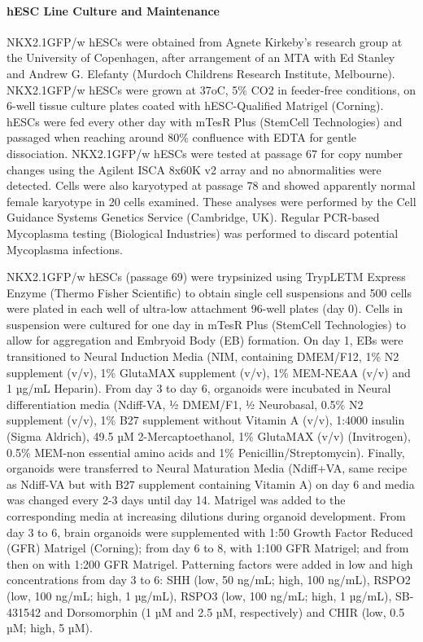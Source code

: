 \paragraph{hESC Line Culture and Maintenance}
NKX2.1GFP/w hESCs were obtained from Agnete Kirkeby’s research group at the University of Copenhagen, after arrangement of an MTA with Ed Stanley and Andrew G. Elefanty (Murdoch Childrens Research Institute, Melbourne). NKX2.1GFP/w hESCs were grown at 37oC, 5\% CO2 in feeder-free conditions, on 6-well tissue culture plates coated with hESC-Qualified Matrigel (Corning). hESCs were fed every other day with mTesR Plus (StemCell Technologies) and passaged when reaching around 80\% confluence with EDTA for gentle dissociation. NKX2.1GFP/w hESCs were tested at passage 67 for copy number changes using the Agilent ISCA 8x60K v2 array and no abnormalities were detected. Cells were also karyotyped at passage 78 and showed apparently normal female karyotype in 20 cells examined. These analyses were performed by the Cell Guidance Systems Genetics Service (Cambridge, UK). Regular PCR-based Mycoplasma testing (Biological Industries) was performed to discard potential Mycoplasma infections.

NKX2.1GFP/w hESCs (passage 69) were trypsinized using TrypLETM Express Enzyme (Thermo Fisher Scientific) to obtain single cell suspensions and 500 cells were plated in each well of ultra-low attachment 96-well plates (day 0). Cells in suspension were cultured for one day in mTesR Plus (StemCell Technologies) to allow for aggregation and Embryoid Body (EB) formation. On day 1, EBs were transitioned to Neural Induction Media (NIM, containing DMEM/F12, 1\% N2 supplement (v/v), 1\% GlutaMAX supplement (v/v), 1\% MEM-NEAA (v/v) and 1 µg/mL Heparin). From day 3 to day 6, organoids were incubated in Neural differentiation media (Ndiff-VA, ½ DMEM/F1, ½ Neurobasal, 0.5\% N2 supplement (v/v), 1\% B27 supplement without Vitamin A (v/v), 1:4000 insulin (Sigma Aldrich), 49.5 µM 2-Mercaptoethanol, 1\% GlutaMAX (v/v) (Invitrogen), 0.5\% MEM-non essential amino acids and 1\% Penicillin/Streptomycin). Finally, organoids were transferred to Neural Maturation Media (Ndiff+VA, same recipe as Ndiff-VA but with B27 supplement containing Vitamin A) on day 6 and media was changed every 2-3 days until day 14. Matrigel was added to the corresponding media at increasing dilutions during organoid development. From day 3 to 6, brain organoids were supplemented with 1:50 Growth Factor Reduced (GFR) Matrigel (Corning); from day 6 to 8, with 1:100 GFR Matrigel; and from then on with 1:200 GFR Matrigel. Patterning factors were added in low and high concentrations from day 3 to 6: SHH (low, 50 ng/mL; high, 100 ng/mL), RSPO2 (low, 100 ng/mL; high, 1 µg/mL), RSPO3 (low, 100 ng/mL; high, 1 µg/mL), SB-431542 and Dorsomorphin (1 µM and 2.5 µM, respectively) and CHIR (low, 0.5 µM; high, 5 µM).  

